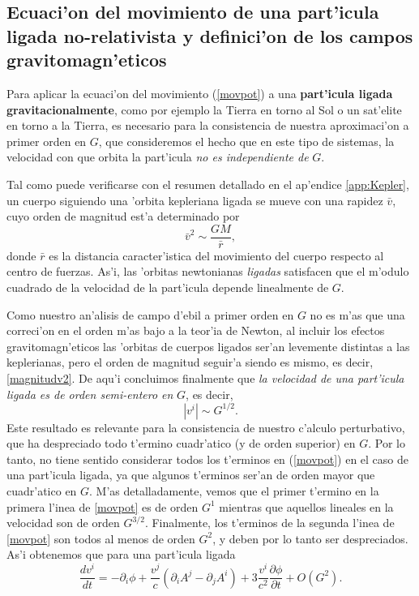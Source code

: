 \subsection{Ecuaci'on del movimiento de una part'icula ligada no-relativista y definici'on de los campos gravitomagn'eticos}

Para aplicar la ecuaci'on del movimiento (\ref{movpot}) a una \textbf{part'icula ligada gravitacionalmente}, como por ejemplo la Tierra en torno al Sol o un sat'elite en torno a la Tierra, es necesario para la consistencia de nuestra aproximaci'on a primer orden en $G$, que consideremos el hecho que en este tipo de sistemas, la velocidad con que orbita la part'icula \textit{no es independiente de} $G$.

Tal como puede verificarse con el resumen detallado en el ap'endice \ref{app:Kepler}, un cuerpo siguiendo una 'orbita kepleriana ligada se mueve con una rapidez $\bar{v}$, cuyo orden de magnitud est'a determinado por
\begin{equation}
\bar{v}^2\sim\frac{GM}{\bar{r}},\label{magnitudv2}
\end{equation}
donde $\bar{r}$ es la distancia caracter'istica del movimiento del cuerpo respecto al centro de fuerzas. As'i, las 'orbitas newtonianas \textit{ligadas} satisfacen que el m'odulo cuadrado de la velocidad de la part'icula depende linealmente de $G$.

Como nuestro an'alisis de campo d'ebil a primer orden en $G$ no es m'as que una correci'on en el orden m'as bajo a la teor'ia de Newton, al incluir los efectos gravitomagn'eticos las 'orbitas de cuerpos ligados ser'an levemente distintas a las keplerianas, pero el orden de magnitud seguir'a siendo es mismo, es decir, \eqref{magnitudv2}.
De aqu'i concluimos finalmente que\textit{ la velocidad de una part'icula ligada es de orden semi-entero en} $G$, es decir,
\begin{equation}\boxed{
|v^i|\sim G^{1/2}.}\label{gfrac}
\end{equation}
Este resultado es relevante para la consistencia de nuestro c'alculo perturbativo, que ha despreciado todo t'ermino cuadr'atico (y de orden superior) en $G$. Por lo tanto, no tiene sentido considerar todos los t'erminos en (\ref{movpot}) en el caso de una part'icula ligada, ya que algunos t'erminos ser'an de orden mayor que cuadr'atico en $G$. M'as detalladamente, vemos que el primer t'ermino en la primera l'inea de \eqref{movpot} es de orden $G^1$ mientras que aquellos lineales en la velocidad son de orden $G^{3/2}$. Finalmente, los t'erminos de la segunda l'inea de \eqref{movpot} son todos al menos de orden $G^2$, y deben por lo tanto ser despreciados. As'i obtenemos que para una part'icula ligada 
\begin{equation}
\frac{dv^{i}}{dt}=-\partial_i\phi+\frac{v^j}{c}(\partial_iA^{j}-\partial_jA^{i})+3\frac{v^i}{c^2}\frac{\partial \phi}{\partial t}+O\left(G^2\right).\label{movnorel}
\end{equation}

